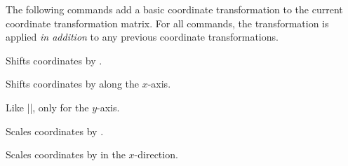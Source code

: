 The following commands add a basic coordinate transformation to the
current coordinate transformation matrix. For all commands, the
transformation is applied \emph{in addition} to any previous
coordinate transformations.

\begin{command}{\pgftransformshift{}}
  Shifts coordinates by .
\begin{codeexample}[]
\end{codeexample}
\end{command}

\begin{command}{\pgftransformxshift{}}
  Shifts coordinates by  along the $x$-axis.
\begin{codeexample}[]
\end{codeexample}
\end{command}

\begin{command}{\pgftransformyshift{}}
  Like |\pgftransformxshift|, only for the $y$-axis.
\end{command}

\begin{command}{\pgftransformscale{}}
  Scales coordinates by .
\begin{codeexample}[]
\end{codeexample}
\end{command}

\begin{command}{\pgftransformxscale{}}
  Scales coordinates by  in the $x$-direction.
\begin{codeexample}[]
\end{codeexample}
\end{command}


